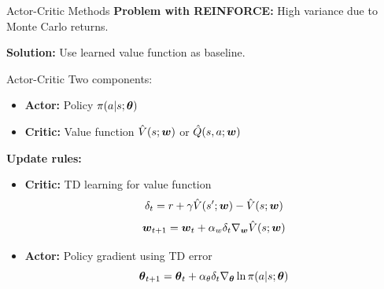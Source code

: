 \documentclass[aspectratio=169]{beamer}
\begin{document}
\begin{frame}{Actor-Critic Methods}
  \textbf{Problem with REINFORCE:} High variance due to Monte Carlo returns.

  \vspace{0.5em}

  \textbf{Solution:} Use learned value function as baseline.

  \vspace{0.5em}

  \begin{definitionbox}{Actor-Critic}
    Two components:
    \begin{itemize}
      \item \textbf{Actor:} Policy $\pi(a|s;\boldsymbol{\theta})$
      \item \textbf{Critic:} Value function $\hat{V}(s;\boldsymbol{w})$ or $\hat{Q}(s,a;\boldsymbol{w})$
    \end{itemize}
  \end{definitionbox}

  \vspace{0.5em}

  \textbf{Update rules:}
  \begin{itemize}
    \item \textbf{Critic:} TD learning for value function
    $$\delta_t = r + \gamma \hat{V}(s';\boldsymbol{w}) - \hat{V}(s;\boldsymbol{w})$$
    $$\boldsymbol{w}_{t+1} = \boldsymbol{w}_t + \alpha_w \delta_t \nabla_{\boldsymbol{w}} \hat{V}(s;\boldsymbol{w})$$

    \item \textbf{Actor:} Policy gradient using TD error
    $$\boldsymbol{\theta}_{t+1} = \boldsymbol{\theta}_t + \alpha_\theta \delta_t \nabla_{\boldsymbol{\theta}} \ln \pi(a|s;\boldsymbol{\theta})$$
  \end{itemize}
\end{frame}
\end{document}
